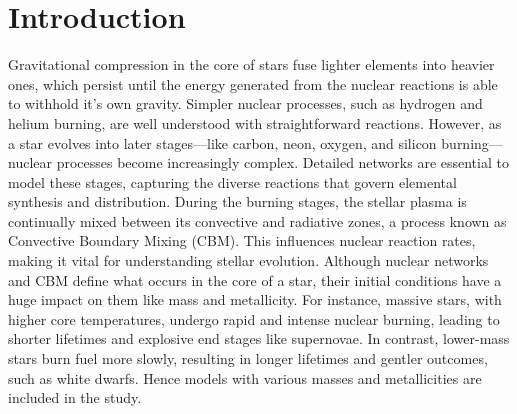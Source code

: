 \section{Introduction}
Gravitational compression in the core of stars fuse lighter elements into heavier ones, which persist until the energy generated from the nuclear reactions is able to withhold it's own gravity. Simpler nuclear processes, such as hydrogen and helium burning, are well understood with straightforward reactions. However, as a star evolves into later stages—like carbon, neon, oxygen, and silicon burning—nuclear processes become increasingly complex. Detailed networks are essential to model these stages, capturing the diverse reactions that govern elemental synthesis and distribution. During the burning stages, the stellar plasma is continually mixed between its convective and radiative zones, a process known as Convective Boundary Mixing (CBM). This influences nuclear reaction rates, making it vital for understanding stellar evolution. Although nuclear networks and CBM define what occurs in the core of a star, their initial conditions have a huge impact on them like mass and metallicity. For instance, massive stars, with higher core temperatures, undergo rapid and intense nuclear burning, leading to shorter lifetimes and explosive end stages like supernovae. In contrast, lower-mass stars burn fuel more slowly, resulting in longer lifetimes and gentler outcomes, such as white dwarfs. Hence models with various masses and metallicities are included in the study.

